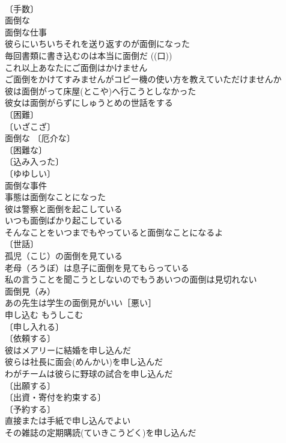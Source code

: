 \documentclass[8pt]{extreport}
\begin{document}
\begin{CJK}{UTF8}{min}
\\	〔手数〕
\\	面倒な 
\\	面倒な仕事 
\\	彼らにいちいちそれを送り返すのが面倒になった 
\\	毎回書類に書き込むのは本当に面倒だ ((口)) 
\\	これ以上あなたにご面倒はかけません 
\\	ご面倒をかけてすみませんがコピー機の使い方を教えていただけませんか 
\\	彼は面倒がって床屋(とこや)へ行こうとしなかった 
\\	彼女は面倒がらずにしゅうとめの世話をする 
\\	〔困難〕
\\	〔いざこざ〕
\\	面倒な 〔厄介な〕
\\	〔困難な〕
\\	〔込み入った〕
\\	〔ゆゆしい〕
\\	面倒な事件 
\\	事態は面倒なことになった 
\\	彼は警察と面倒を起こしている 
\\	いつも面倒ばかり起こしている 
\\	そんなことをいつまでもやっていると面倒なことになるよ 
\\	〔世話〕
\\	孤児（こじ）の面倒を見ている 
\\	老母（ろうぼ）は息子に面倒を見てもらっている 
\\	私の言うことを聞こうとしないのでもうあいつの面倒は見切れない 
\\	面倒見（み）　
\\	あの先生は学生の面倒見がいい［悪い］ 
\\	申し込む	もうしこむ	
\\	〔申し入れる〕
\\	〔依頼する〕
\\	彼はメアリーに結婚を申し込んだ 
\\	彼らは社長に面会(めんかい)を申し込んだ 
\\	わがチームは彼らに野球の試合を申し込んだ 
\\	〔出願する〕
\\	〔出資・寄付を約束する〕
\\	〔予約する〕
\\	直接または手紙で申し込んでよい 
\\	その雑誌の定期購読(ていきこうどく)を申し込んだ 

\end{CJK}
\end{document}
